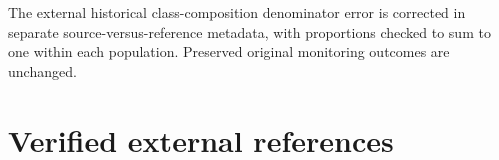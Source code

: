 \documentclass[11pt,a4paper]{article}
\begin{document}
The external historical class-composition denominator error is corrected in separate source-versus-reference metadata, with proportions checked to sum to one within each population. Preserved original monitoring outcomes are unchanged.\par
\section{Verified external references}\cite{garg2022,ovadia2019}
\end{document}

